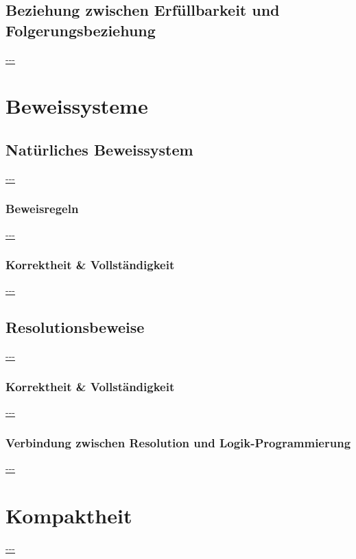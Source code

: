 \documentclass[twocolumn]{article}
\begin{document}
    \subsection{Beziehung zwischen Erfüllbarkeit und Folgerungsbeziehung}
    \url{---}\\

    \section{Beweissysteme}

    \subsection{Natürliches Beweissystem}
    \url{---}\\

    \subsubsection{Beweisregeln}
    \url{---}\\

    \subsubsection{Korrektheit \& Vollständigkeit}
    \url{---}\\

    \subsection{Resolutionsbeweise}
    \url{---}\\

    \subsubsection{Korrektheit \& Vollständigkeit}
    \url{---}\\

    \subsubsection{Verbindung zwischen Resolution und Logik-Programmierung}
    \url{---}\\

    \section{Kompaktheit}
    \url{---}\\
\end{document}

